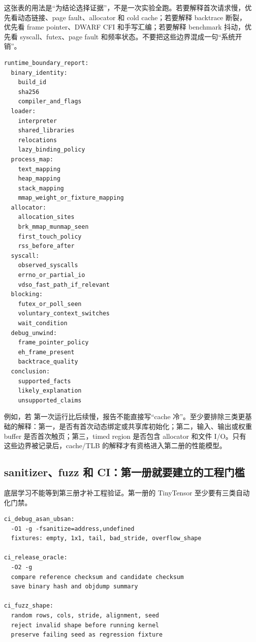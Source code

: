 这张表的用法是“为结论选择证据”，不是一次实验全跑。若要解释首次请求慢，优先看动态链接、page fault、allocator 和 cold cache；若要解释 backtrace 断裂，优先看 frame pointer、DWARF CFI 和手写汇编；若要解释 benchmark 抖动，优先看 syscall、futex、page fault 和频率状态。不要把这些边界混成一句“系统开销”。

\begin{lstlisting}[numbers=none,caption={TinyTensor 运行时边界报告模板}]
runtime_boundary_report:
  binary_identity:
    build_id
    sha256
    compiler_and_flags
  loader:
    interpreter
    shared_libraries
    relocations
    lazy_binding_policy
  process_map:
    text_mapping
    heap_mapping
    stack_mapping
    mmap_weight_or_fixture_mapping
  allocator:
    allocation_sites
    brk_mmap_munmap_seen
    first_touch_policy
    rss_before_after
  syscall:
    observed_syscalls
    errno_or_partial_io
    vdso_fast_path_if_relevant
  blocking:
    futex_or_poll_seen
    voluntary_context_switches
    wait_condition
  debug_unwind:
    frame_pointer_policy
    eh_frame_present
    backtrace_quality
  conclusion:
    supported_facts
    likely_explanation
    unsupported_claims
\end{lstlisting}

例如，若  第一次运行比后续慢，报告不能直接写“cache 冷”。至少要排除三类更基础的解释：第一，是否有首次动态绑定或共享库初始化；第二，输入、输出或权重 buffer 是否首次触页；第三，timed region 是否包含 allocator 和文件 I/O。只有这些边界被记录后，cache/TLB 的解释才有资格进入第二册的性能模型。

\subsection{sanitizer、fuzz 和 CI：第一册就要建立的工程门槛}

底层学习不能等到第三册才补工程验证。第一册的 TinyTensor 至少要有三类自动化门禁。

\begin{lstlisting}[numbers=none,caption={TinyTensor 的最低 CI 矩阵}]
ci_debug_asan_ubsan:
  -O1 -g -fsanitize=address,undefined
  fixtures: empty, 1x1, tail, bad_stride, overflow_shape

ci_release_oracle:
  -O2 -g
  compare reference checksum and candidate checksum
  save binary hash and objdump summary

ci_fuzz_shape:
  random rows, cols, stride, alignment, seed
  reject invalid shape before running kernel
  preserve failing seed as regression fixture
\end{lstlisting}

